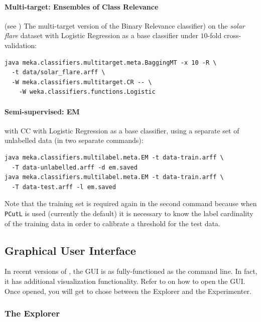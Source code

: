 \documentclass[11pt]{article}
\newcommand{\MEKA}{Meka}
\begin{document}
\paragraph{Multi-target: Ensembles of Class Relevance} (see \cite{UPM}) The multi-target version of the Binary Relevance classifier) on the \textit{solar flare} dataset with Logistic Regression as a base classifier under $10$-fold cross-validation:
\begin{lstlisting}
java meka.classifiers.multitarget.meta.BaggingMT -x 10 -R \
  -t data/solar_flare.arff \
  -W meka.classifiers.multitarget.CR -- \
    -W weka.classifiers.functions.Logistic
\end{lstlisting}
 
\paragraph{Semi-supervised: EM} with CC with Logistic Regression as a base classifier, using a separate set of unlabelled data (in two separate commands):
\begin{lstlisting}
java meka.classifiers.multilabel.meta.EM -t data-train.arff \
  -T data-unlabelled.arff -d em.saved
java meka.classifiers.multilabel.meta.EM -t data-train.arff \
  -T data-test.arff -l em.saved
\end{lstlisting}

Note that the training set is required again in the second command because when \texttt{PCutL} is used (currently the default) it is necessary to know the label cardinality of the training data in order to calibrate a threshold for the test data.

\subsection{Graphical User Interface}

In recent versions of \framework{\MEKA}, the GUI is as fully-functioned as the command line. In fact, it has additional visualization functionality. Refer to  on how to open the GUI. Once opened, you will get to chose between the \textsf{Explorer} and the \textsf{Experimenter}. 

\subsubsection{The Explorer}
\end{document}
